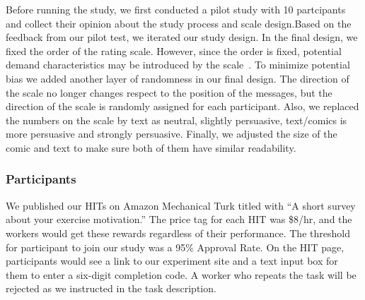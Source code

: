 Before running the study, we first conducted a pilot study with 10 partcipants and collect their opinion about the study process and scale design.Based on the feedback from our pilot test, we iterated our study design. In the final design, we fixed the order of the rating scale. However, since the order is fixed, potential demand characteristics may be introduced by the scale~\cite{orne1962social}. To minimize potential bias we added another layer of randomness in our final design. The direction of the scale no longer changes respect to the position of the messages, but the direction of the scale is randomly assigned for each participant. Also, we replaced the numbers on the scale by text as neutral, slightly persuasive, text/comics is more persuasive and strongly persuasive. Finally, we adjusted the size of the comic and text to make sure both of them have similar readability.
%



\subsubsection{Participants}
We published our HITs on Amazon Mechanical Turk titled with ``A short survey about your exercise motivation.'' The price tag for each HIT was \$8/hr, and the workers would get these rewards regardless of their performance. The threshold for participant to join our study was a 95\% Approval Rate. On the HIT page, participants would see a link to our experiment site and a text input box for them to enter a six-digit completion code. A worker who repeats the task will be rejected as we instructed in the task description.
